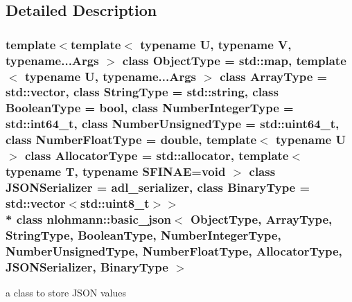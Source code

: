\subsection{Detailed Description}
\subsubsection*{template$<$template$<$ typename U, typename V, typename...\+Args $>$ class Object\+Type = std\+::map, template$<$ typename U, typename...\+Args $>$ class Array\+Type = std\+::vector, class String\+Type = std\+::string, class Boolean\+Type = bool, class Number\+Integer\+Type = std\+::int64\+\_\+t, class Number\+Unsigned\+Type = std\+::uint64\+\_\+t, class Number\+Float\+Type = double, template$<$ typename U $>$ class Allocator\+Type = std\+::allocator, template$<$ typename T, typename S\+F\+I\+N\+A\+E=void $>$ class J\+S\+O\+N\+Serializer = adl\+\_\+serializer, class Binary\+Type = std\+::vector$<$std\+::uint8\+\_\+t$>$$>$\\*
class nlohmann\+::basic\+\_\+json$<$ Object\+Type, Array\+Type, String\+Type, Boolean\+Type, Number\+Integer\+Type, Number\+Unsigned\+Type, Number\+Float\+Type, Allocator\+Type, J\+S\+O\+N\+Serializer, Binary\+Type $>$}

a class to store J\+S\+ON values 


